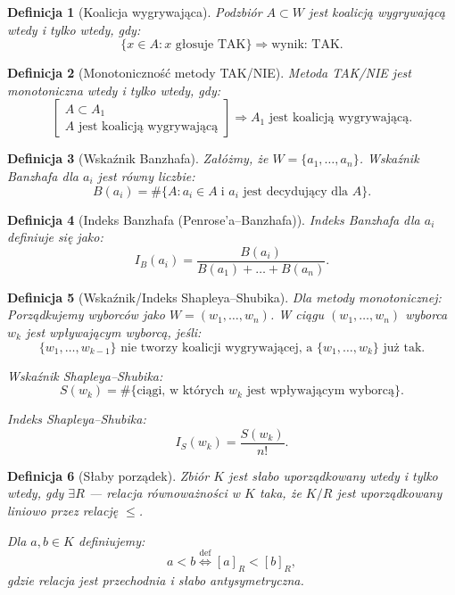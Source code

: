 \documentclass[12pt,a4paper]{article}
\theoremstyle{break}
\newtheorem{definition}{Definicja}[section]
\begin{document}
	\begin{definition}[Koalicja wygrywająca]
		Podzbiór $A \subset W$ jest koalicją wygrywającą wtedy i tylko wtedy, gdy:  
		$$\{x \in A : x \text{ głosuje TAK} \} \Rightarrow \text{wynik: TAK.}$$
	\end{definition}
	
	\begin{definition}[Monotoniczność metody TAK/NIE]
		Metoda TAK/NIE jest monotoniczna wtedy i tylko wtedy, gdy:  
		$$
		\begin{bmatrix}
			A \subset A_1 \\
			A \text{ jest koalicją wygrywającą}
		\end{bmatrix}
		\Rightarrow A_1 \text{ jest koalicją wygrywającą.}
		$$
	\end{definition}
	
	\begin{definition}[Wskaźnik Banzhafa]
		Załóżmy, że $W = \{a_1, \dots, a_n\}$.  
		Wskaźnik Banzhafa dla $a_i$ jest równy liczbie:
		$$B(a_i) = \# \{ A : a_i \in A \; \text{i $a_i$ jest decydujący dla $A$} \}.$$
	\end{definition}
	
	\begin{definition}[Indeks Banzhafa (Penrose’a–Banzhafa)]
		Indeks Banzhafa dla $a_i$ definiuje się jako:
		$$I_B(a_i) = \frac{B(a_i)}{B(a_1) + \dots + B(a_n)}.$$
	\end{definition}

	\begin{definition}[Wskaźnik/Indeks Shapleya–Shubika]
		Dla metody monotonicznej:  
		Porządkujemy wyborców jako $W = (w_1, \dots, w_n)$.  
		W ciągu $(w_1, \dots, w_n)$ wyborca $w_k$ jest wpływającym wyborcą, jeśli:
		\[
		\{w_1, \dots, w_{k-1}\} \text{ nie tworzy koalicji wygrywającej, a } \{w_1, \dots, w_k\} \text{ już tak.}
		\]
		
		Wskaźnik Shapleya–Shubika:
		\[
		S(w_k) = \# \{\text{ciągi, w których } w_k \text{ jest wpływającym wyborcą}\}.
		\]
		
		Indeks Shapleya–Shubika:
		\[
		I_S(w_k) = \frac{S(w_k)}{n!}.
		\]
	\end{definition}

	\begin{definition}[Słaby porządek]
		Zbiór $K$ jest słabo uporządkowany wtedy i tylko wtedy, gdy $\exists R$ — relacja równoważności w $K$ taka, że $K / R$ jest uporządkowany liniowo przez relację $\leq$. 
		
		Dla $a, b \in K$ definiujemy: 
		\[
		a < b \overset{\text{def}}{\Leftrightarrow} [a]_R < [b]_R,
		\]
		gdzie relacja jest przechodnia i słabo antysymetryczna.
	\end{definition}
\end{document}
